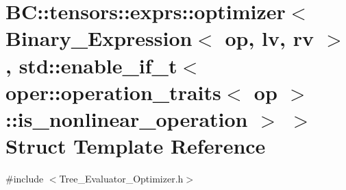 \hypertarget{structBC_1_1tensors_1_1exprs_1_1optimizer_3_01Binary__Expression_3_01op_00_01lv_00_01rv_01_4_00_11116ffe640829700a69ab4f1bad216e}{}\section{BC\+:\+:tensors\+:\+:exprs\+:\+:optimizer$<$ Binary\+\_\+\+Expression$<$ op, lv, rv $>$, std\+:\+:enable\+\_\+if\+\_\+t$<$ oper\+:\+:operation\+\_\+traits$<$ op $>$\+:\+:is\+\_\+nonlinear\+\_\+operation $>$ $>$ Struct Template Reference}
\label{structBC_1_1tensors_1_1exprs_1_1optimizer_3_01Binary__Expression_3_01op_00_01lv_00_01rv_01_4_00_11116ffe640829700a69ab4f1bad216e}


{\ttfamily \#include $<$Tree\+\_\+\+Evaluator\+\_\+\+Optimizer.\+h$>$}

